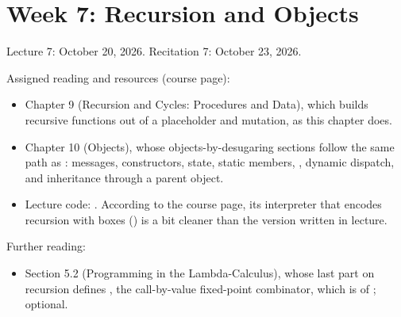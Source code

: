\chapter{Week 7: Recursion and Objects}
\label{ch:week7}

Lecture 7: October 20, 2026. Recitation 7: October 23, 2026.

Assigned reading and resources (course page):
\begin{itemize}
  \item \cite{PLAI} Chapter 9 (Recursion and Cycles: Procedures and Data), which builds recursive functions out of a placeholder and mutation, as this chapter does.
  \item \cite{PLAI} Chapter 10 (Objects), whose objects-by-desugaring sections follow the same path as : messages, constructors, state, static members, , dynamic dispatch, and inheritance through a parent object.
  \item Lecture code: . According to the course page, its interpreter that encodes recursion with boxes () is a bit cleaner than the version written in lecture.
\end{itemize}

Further reading:
\begin{itemize}
  \item \cite{TAPL} Section 5.2 (Programming in the Lambda-Calculus), whose last part on recursion defines , the call-by-value fixed-point combinator, which is  of ; optional.
\end{itemize}

